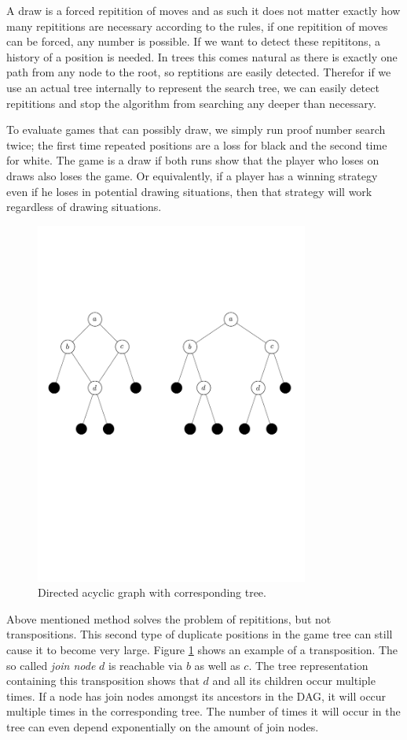 \documentclass{article}
\begin{document}
A draw is a forced repitition of moves and as such it does not matter exactly how many repititions are necessary according to the rules,
if one repitition of moves can be forced, any number is possible. If we want to detect these repititons, a history of a position is needed. In trees this
comes natural as there is exactly one path from any node to the root, so reptitions are easily detected. Therefor if we use an actual tree internally
to represent the search tree, we can easily detect repititions and stop the algorithm from searching any deeper than necessary.

To evaluate games that can possibly draw, we simply run proof number search twice; the first time repeated positions are a loss for black and the second time for white.
The game is a draw if both runs show that the player who loses on draws also loses the game. Or equivalently, if a player has a winning strategy
even if he loses in potential drawing situations, then that strategy will work regardless of drawing situations.\\

\begin{figure}[h]
\center
\includegraphics[trim = 0mm 10cm 0cm 0cm, clip, width=9cm]{treevsgraph.pdf}
\caption{Directed acyclic graph with corresponding tree.}
\label{treevsgraph}
\end{figure}

Above mentioned method solves the problem of repititions, but not transpositions. This second type of duplicate positions in the game tree
can still cause it to become very large. Figure \ref{treevsgraph} shows an example of a transposition. The so called \emph{join node} $d$ is
reachable via $b$ as well as $c$. The tree representation containing this transposition shows that $d$ and all its children occur multiple times.
If a node has join nodes amongst its ancestors in the DAG, it will
occur multiple times in the corresponding tree. The number of times it will occur in the tree can even depend exponentially on the amount of join
nodes.
\end{document}
